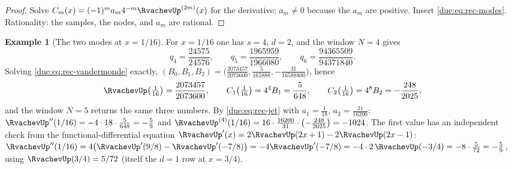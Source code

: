 \documentclass[11pt,oneside]{article}
\theoremstyle{plain}
\theoremstyle{definition}
\newtheorem{example}[theorem]{Example}
\theoremstyle{remark}
\newcommand{\upn}[1]{\RvachevUp_{#1}}
\newcommand{\am}[1]{a_{#1}}                                 %
\newcommand{\Cr}[2]{C_{#1}\!\left(#2\right)}                %
\newcommand{\qn}[1]{q_{#1}}                                 %
\begin{document}
\begin{proof}
Solve $\Cr{m}{x}=(-1)^{m}\am{m}4^{-m}\RvachevUp^{(2m)}(x)$ for the derivative;
$\am{m}\neq0$ because the $\am{m}$ are positive.  Insert
\cref{due:eq:rec-modes}.  Rationality: the samples, the nodes, and $\am{m}$
are rational.
\end{proof}

\begin{example}[The two modes at $x=1/16$]
\label{due:ex:rec-sixteenth}
For $x=1/16$ one has $s=4$, $d=2$, and the window $N=4$ gives
\[
 \qn{4}=\frac{24575}{24576},\qquad
 \qn{5}=\frac{1965959}{1966080},\qquad
 \qn{6}=\frac{94365509}{94371840}.
\]
Solving \cref{due:eq:rec-vandermonde} exactly,
$(B_{0},B_{1},B_{2})=\bigl(\tfrac{2073457}{2073600},\tfrac{5}{165888},
-\tfrac{31}{16588800}\bigr)$, hence
\[
 \RvachevUp\bigl(\tfrac1{16}\bigr)=\frac{2073457}{2073600},\qquad
 \Cr{1}{\tfrac1{16}}=4^{4}B_{1}=\frac{5}{648},\qquad
 \Cr{2}{\tfrac1{16}}=4^{8}B_{2}=-\frac{248}{2025},
\]
and the window $N=5$ returns the same three numbers.  By
\cref{due:eq:rec-jet} with $\am{1}=\tfrac1{18}$, $\am{2}=\tfrac{31}{16200}$:
$\RvachevUp''(1/16)=-4\cdot18\cdot\tfrac{5}{648}=-\tfrac59$ and
$\RvachevUp^{(4)}(1/16)=16\cdot\tfrac{16200}{31}\cdot\bigl(-\tfrac{248}{2025}\bigr)
=-1024$.  The first value has an independent check from the
functional-differential equation $\RvachevUp'(x)=2\RvachevUp(2x+1)-2\RvachevUp(2x-1)$:
$\RvachevUp''(1/16)=4\bigl(\RvachevUp'(9/8)-\RvachevUp'(-7/8)\bigr)
=-4\RvachevUp'(-7/8)=-4\cdot2\,\RvachevUp(-3/4)=-8\cdot\tfrac{5}{72}=-\tfrac59$,
using $\RvachevUp(3/4)=5/72$ (itself the $d=1$ row at $x=3/4$).
\end{example}
\end{document}
